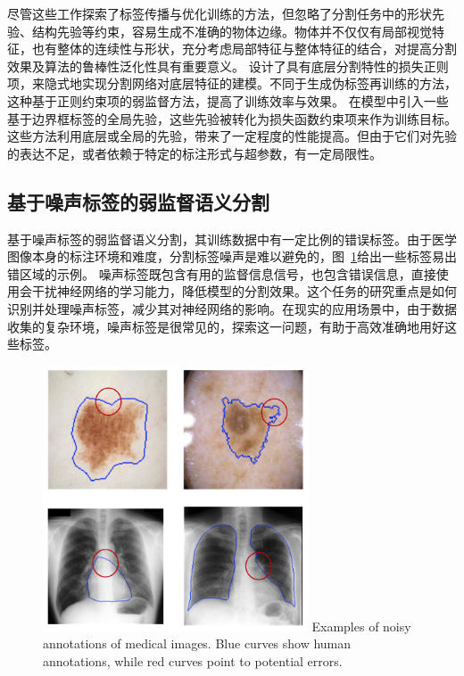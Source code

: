尽管这些工作探索了标签传播与优化训练的方法，但忽略了分割任务中的形状先验、结构先验等约束，容易生成不准确的物体边缘。物体并不仅仅有局部视觉特征，也有整体的连续性与形状，充分考虑局部特征与整体特征的结合，对提高分割效果及算法的鲁棒性泛化性具有重要意义。
\citet{tang2018regularized} 设计了具有底层分割特性的损失正则项，来隐式地实现分割网络对底层特征的建模。不同于生成伪标签再训练的方法，这种基于正则约束项的弱监督方法，提高了训练效率与效果。
\citet{kervadec2020bounding} 在模型中引入一些基于边界框标签的全局先验，这些先验被转化为损失函数约束项来作为训练目标。
这些方法利用底层或全局的先验，带来了一定程度的性能提高。但由于它们对先验的表达不足，或者依赖于特定的标注形式与超参数，有一定局限性。


\subsection{基于噪声标签的弱监督语义分割}
基于噪声标签的弱监督语义分割，其训练数据中有一定比例的错误标签。由于医学图像本身的标注环境和难度，分割标签噪声是难以避免的，图~\ref{c1_fig3}给出一些标签易出错区域的示例。
噪声标签既包含有用的监督信息信号，也包含错误信息，直接使用会干扰神经网络的学习能力，降低模型的分割效果。这个任务的研究重点是如何识别并处理噪声标签，减少其对神经网络的影响。在现实的应用场景中，由于数据收集的复杂环境，噪声标签是很常见的，探索这一问题，有助于高效准确地用好这些标签。
    \begin{figure}[t!]
        \centering 
        \includegraphics[width=0.7\textwidth]{img/c1/intro_3.png}
        {Examples of noisy annotations of medical images. Blue curves show human annotations, while red curves point to potential errors.}
        \label{c1_fig3}
    \end{figure}

